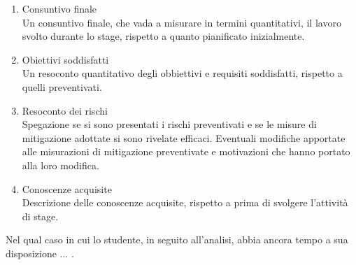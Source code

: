 \begin{enumerate}
    \item Consuntivo finale \\
    Un consuntivo finale, che vada a misurare in termini quantitativi,
    il lavoro svolto durante lo stage, rispetto a quanto pianificato
    inizialmente.

    \item Obiettivi soddisfatti \\
    Un resoconto quantitativo degli obbiettivi e requisiti soddisfatti, 
    rispetto a quelli preventivati.

    \item Resoconto dei rischi \\
    Spegazione se si sono presentati i rischi preventivati e se le misure 
    di mitigazione adottate si sono rivelate efficaci. Eventuali modifiche
    apportate alle misurazioni di mitigazione preventivate e motivazioni 
    che hanno portato alla loro modifica.

    \item Conoscenze acquisite \\
    Descrizione delle conoscenze acquisite, rispetto a prima di svolgere
    l'attività di stage.
\end{enumerate}

Nel qual caso in cui lo studente, in seguito all'analisi, abbia ancora tempo a sua disposizione ... .
